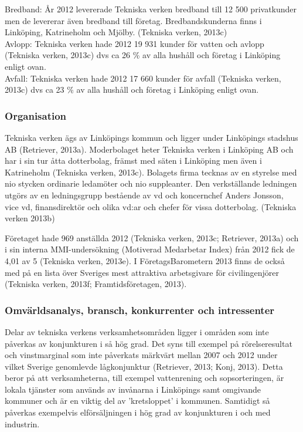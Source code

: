 \documentclass[10pt,a4paper]{article}
\begin{document}
Bredband: År 2012 levererade Tekniska verken bredband till 12 500 privatkunder men de levererar även bredband till företag. Bredbandskunderna finns i  Linköping, Katrineholm och Mjölby. (Tekniska verken, 2013c)\\

Avlopp: Tekniska verken hade 2012 19 931 kunder för vatten och avlopp (Tekniska verken, 2013c) dvs ca 26 \% av alla hushåll och företag i Linköping enligt ovan. \\

Avfall: Tekniska verken hade 2012 17 660 kunder för avfall (Tekniska verken, 2013c) dvs ca 23 \% av alla hushåll och företag i Linköping enligt ovan. 

\subsubsection{Organisation}
Tekniska verken ägs av Linköpings kommun och ligger under Linköpings stadshus AB (Retriever, 2013a). Moderbolaget heter Tekniska verken i Linköping AB och har i sin tur åtta dotterbolag, främst med säten i Linköping men även i Katrineholm (Tekniska verken, 2013c).  Bolagets firma tecknas av en styrelse med nio stycken ordinarie ledamöter och nio suppleanter. Den verkställande ledningen utgörs av en ledningsgrupp bestående av vd och koncernchef Anders Jonsson, vice vd, finansdirektör och olika vd:ar och chefer för vissa dotterbolag. (Tekniska verken 2013b)

Företaget hade 969 anställda 2012 (Tekniska verken, 2013c; Retriever, 2013a) och i sin interna MMI-undersökning (Motiverad Medarbetar Index) från 2012 fick de 4,01 av 5 (Tekniska verken, 2013e). I FöretagsBarometern 2013 finns de också med på en lista över Sveriges mest attraktiva arbetsgivare för civilingenjörer (Tekniska verken, 2013f; Framtidsföretagen, 2013). 

\subsubsection{Omvärldsanalys, bransch, konkurrenter och intressenter}
Delar av tekniska verkens verksamhetsområden ligger i områden som inte
påverkas av konjunkturen i så hög grad. Det syns till exempel på
rörelseresultat och vinstmarginal som inte påverkats märkvärt mellan
2007 och 2012 under vilket Sverige genomlevde lågkonjunktur (Retriever, 2013; Konj, 2013). Detta beror på att verksamheterna, till exempel vattenrening och sopsorteringen, är lokala tjänster som används av 
invånarna i Linköpings samt omgivande kommuner och är en viktig del av 'kretsloppet' i kommunen.
Samtidigt så påverkas exempelvis elförsäljningen i hög grad av konjunkturen i
och med industrin.
\end{document}
